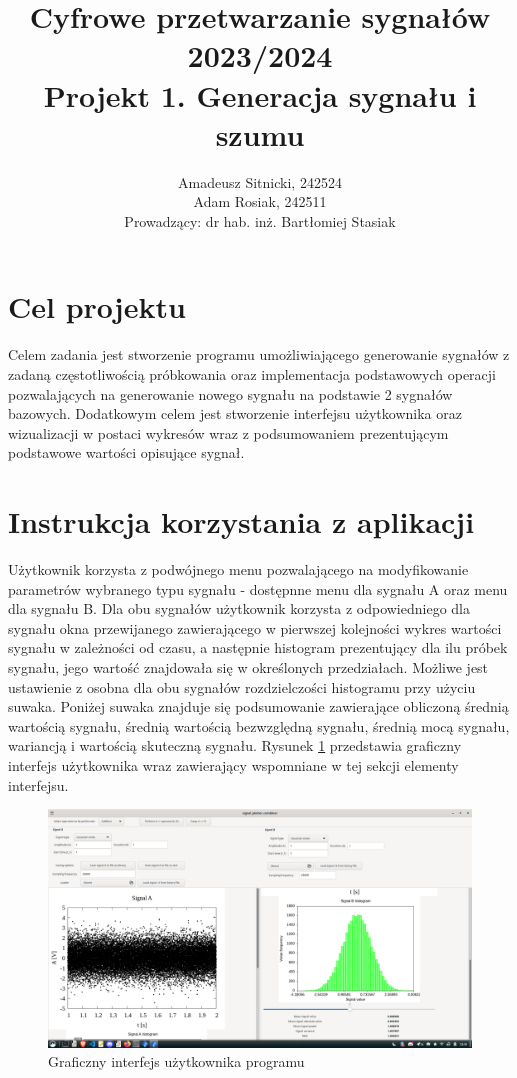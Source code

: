 \documentclass{article}
\author{
	{Amadeusz Sitnicki, 242524} \\
	{Adam Rosiak, 242511}\\
{Prowadzący: dr hab. inż. Bartłomiej Stasiak}
}
\title{Cyfrowe przetwarzanie sygnałów 2023/2024\\Projekt 1. Generacja sygnału i szumu}
\begin{document}
\maketitle
\section{Cel projektu}
Celem zadania jest stworzenie programu umożliwiającego generowanie sygnałów z zadaną częstotliwością próbkowania oraz implementacja podstawowych operacji pozwalających na generowanie nowego sygnału na podstawie 2 sygnałów bazowych. Dodatkowym celem jest stworzenie interfejsu użytkownika oraz wizualizacji w postaci wykresów wraz z podsumowaniem prezentującym podstawowe wartości  opisujące sygnał.

\section{Instrukcja korzystania z aplikacji}
Użytkownik korzysta z podwójnego menu pozwalającego na modyfikowanie parametrów wybranego typu sygnału - dostępnne menu dla sygnału A oraz menu dla sygnału B. Dla obu sygnałów użytkownik korzysta z odpowiedniego dla sygnału okna przewijanego zawierającego w pierwszej kolejności wykres wartości sygnału w zależności od czasu, a następnie histogram prezentujący dla ilu próbek sygnału, jego wartość znajdowała się w określonych przedziałach. Możliwe jest ustawienie z osobna dla obu sygnałów rozdzielczości histogramu przy użyciu suwaka. Poniżej suwaka znajduje się podsumowanie zawierające obliczoną średnią wartością sygnału, średnią wartością bezwzględną sygnału, średnią mocą sygnału, wariancją i wartością skuteczną sygnału. Rysunek \ref{fig:gui} przedstawia graficzny interfejs użytkownika wraz zawierający wspomniane w tej sekcji elementy interfejsu.

\begin{figure}[h!]
 \centering
 \includegraphics[width=14cm]{gui.png}
 \vspace{-0.3cm}
 \caption{Graficzny interfejs użytkownika programu}
 \label{fig:gui}
\end{figure}
\end{document}
